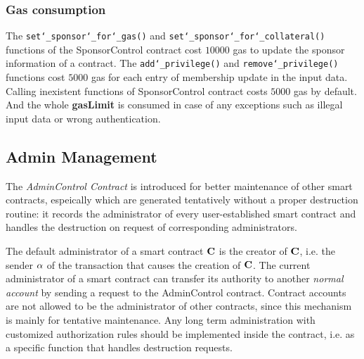 \subsubsection{Gas consumption}

The {\tt set\char`_sponsor\char`_for\char`_gas()} and {\tt set\char`_sponsor\char`_for\char`_collateral()} functions of the SponsorControl contract cost $10000$ gas to update the sponsor information of a contract.
The {\tt add\char`_privilege()} and {\tt remove\char`_privilege()} functions cost $5000$ gas for each entry of membership update in the input data.
Calling inexistent functions of SponsorControl contract costs $5000$ gas by default.
And the whole {\bf gasLimit} is consumed in case of any exceptions such as illegal input data or wrong authentication.


\subsection{Admin Management}
\label{sec:admin}

The \emph{AdminControl Contract} is introduced for better maintenance of other smart contracts, espeically which are generated tentatively without a proper destruction routine:
it records the administrator of every user-established smart contract and handles the destruction on request of corresponding administrators.

The default administrator of a smart contract $\mathbf{C}$ is the  creator of $\mathbf{C}$, i.e. the sender $\mathbf{\alpha}$ of the transaction that causes the creation of $\mathbf{C}$.
The current administrator of a smart contract can transfer its authority to another \emph{normal account} by sending a request to the AdminControl contract.
Contract accounts are not allowed to be the administrator of other contracts,
since this mechanism is mainly for tentative maintenance.
Any long term administration with customized authorization rules should be implemented inside the contract,
i.e. as a specific function that handles destruction requests.

